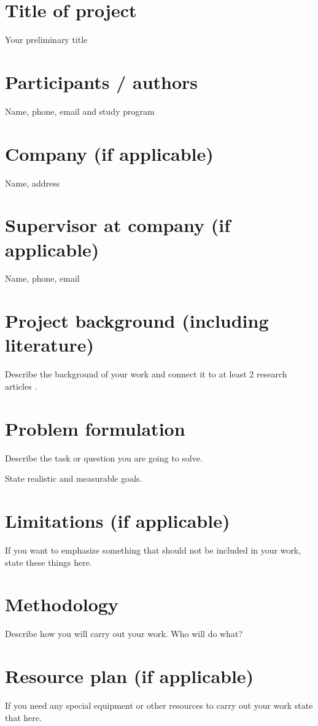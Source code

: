 \documentclass[12pt]{article}
\begin{document}
\thispagestyle{fancy}

\section*{Title of project}
Your preliminary title

\section*{Participants / authors}
Name, phone, email and study program

\section*{Company (if applicable)}
Name, address

\section*{Supervisor at company (if applicable)}
Name, phone, email

\section*{Project background (including literature)}
Describe the background of your work and connect it to at least
2 research articles \cite{höst2015}.

\section*{Problem formulation}
Describe the task or question you are going to solve.

State realistic and measurable goals.

\section*{Limitations (if applicable)}
If you want to emphasize something that should not be included
in your work, state these things here.

\section*{Methodology}
Describe how you will carry out your work. Who will do what?

\section*{Resource plan (if applicable)}
If you need any special equipment or other resources to carry out
your work state that here.

\printbibliography[
    heading=bibintoc,
    title={References}
]
\end{document}
